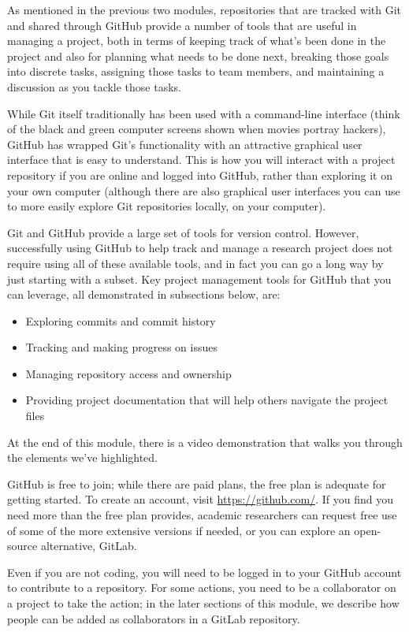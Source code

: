 \documentclass[]{tufte-book}
\providecommand{\tightlist}{%
  \setlength{\itemsep}{0pt}\setlength{\parskip}{0pt}}
\begin{document}
As mentioned in the previous two modules, repositories that are tracked with
Git and shared through GitHub provide a number of tools that are useful in
managing a project, both in terms of keeping track of what's been done in the
project and also for planning what needs to be done next, breaking those goals
into discrete tasks, assigning those tasks to team members, and maintaining a
discussion as you tackle those tasks.

While Git itself traditionally has been used with a command-line interface
(think of the black and green computer screens shown when movies portray
hackers), GitHub has wrapped Git's functionality with an attractive graphical
user interface that is easy to understand. This is how you will interact with a
project repository if you are online and logged into GitHub, rather than
exploring it on your own computer (although there are also graphical user
interfaces you can use to more easily explore Git repositories locally, on your
computer).

Git and GitHub provide a large set of tools for version control. However,
successfully using GitHub to help track and manage a research project does not
require using all of these available tools, and in fact you can go a long way by
just starting with a subset. Key project management tools for GitHub that you
can leverage, all demonstrated in subsections below, are:

\begin{itemize}
\tightlist
\item
  Exploring commits and commit history
\item
  Tracking and making progress on issues
\item
  Managing repository access and ownership
\item
  Providing project documentation that will help others navigate the project
  files
\end{itemize}

At the end of this module, there is a video demonstration that walks you through
the elements we've highlighted.

GitHub is free to join; while there are paid plans, the free plan is adequate
for getting started. To create an account, visit \url{https://github.com/}. If you
find you need more than the free plan provides, academic researchers can request
free use of some of the more extensive versions if needed, or you can explore an
open-source alternative, GitLab.

Even if you are not coding, you will need to be logged in to your GitHub account
to contribute to a repository. For some actions, you need to be a collaborator
on a project to take the action; in the later sections of this module, we
describe how people can be added as collaborators in a GitLab repository.
\end{document}

